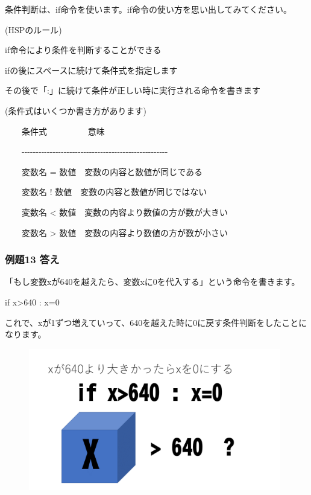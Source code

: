 条件判断は、if命令を使います。if命令の使い方を思い出してみてください。

\begin{description}
    \item (HSPのルール)
\end{description}

\begin{description}
    \item if命令により条件を判断することができる
    \item ifの後にスペースに続けて条件式を指定します
    \item その後で「:」に続けて条件が正しい時に実行される命令を書きます
\end{description}

\begin{description}
    \item (条件式はいくつか書き方があります)
\end{description}
\ \ \ \ 条件式 \ \ \ \ \ \ \ \ \ 意味

\ \ \ \ {}-{}-{}-{}-{}-{}-{}-{}-{}-{}-{}-{}-{}-{}-{}-{}-{}-{}-{}-{}-{}-{}-{}-{}-{}-{}-{}-{}-{}-{}-{}-{}-{}-{}-{}-{}-{}-{}-{}-{}-{}-{}-{}-{}-{}-{}-{}-{}-{}-{}-{}-{}-

\ \ \ \ 変数名 =
数値\ \ 変数の内容と数値が同じである

\ \ \ \ 変数名 !
数値\ \ 変数の内容と数値が同じではない

\ \ \ \ 変数名 {\textless}
数値\ \ 変数の内容より数値の方が数が大きい

\ \ \ \ 変数名 {\textgreater}
数値\ \ 変数の内容より数値の方が数が小さい

\subsubsection*{例題13 答え}

「もし変数xが640を越えたら、変数xに0を代入する」という命令を書きます。

\begin{description}
    \item if x{\textgreater}640 : x=0
\end{description}

これで、xが1ずつ増えていって、640を越えた時に0に戻す条件判断をしたことになります。

\begin{figure}[H]
    \begin{center}
        \includegraphics[keepaspectratio,width=11.033cm,height=6.209cm]{text02-img/text02-img052.png}
    \end{center}
\end{figure}

